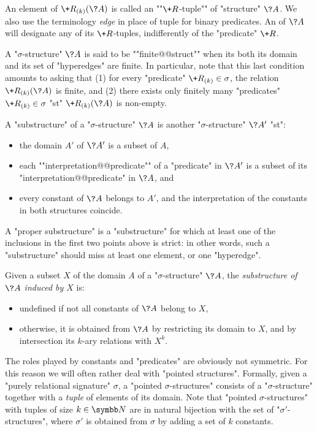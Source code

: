 An element of $\+R_{(k)}(\?A)$ is called an \AP""$\+R$-tuple""
of "structure" $\?A$. We also use the terminology \emph{edge} in place
of tuple for binary predicates.
An  of $\?A$ will designate any of its $\+R$-tuples,
indifferently of the "predicate" $\+R$.

A "$\sigma$-structure" $\?A$ is said to be \AP""finite@@struct"" when its
both its domain and its set of "hyperedges" are finite.
In particular, note that this last condition amounts to asking
that (1) for every "predicate" $\+R_{(k)} \in \sigma$, the relation $\+R_{(k)}(\?A)$ is finite,
and (2) there exists only finitely many "predicates" $\+R_{(k)} \in \sigma$
"st" $\+R_{(k)}(\?A)$ is non-empty.

A "substructure" of a "$\sigma$-structure" $\?A$ is another
"$\sigma$-structure" $\?A'$ "st":
\begin{itemize}
	\item the domain $A'$ of $\?A'$ is a subset of $A$,
	\item each ""interpretation@@predicate"" of a "predicate" in $\?A'$ 
		is a subset of its "interpretation@@predicate" in $\?A$, and
	\item every constant of $\?A$ belongs to $A'$, and the interpretation
		of the constants in both structures coincide. 
\end{itemize}
A "proper substructure" is a "substructure" for which
at least one of the inclusions in the first two points above
is strict: in other words, such a "substructure" should
miss at least one element, or one "hyperedge".

Given a subset $X$ of the domain $A$ of a "$\sigma$-structure" $\?A$,
the \emph{substructure of $\?A$ induced by $X$} is:
\begin{itemize}
	\item undefined if not all constants of $\?A$ belong to $X$,
	\item otherwise, it is obtained from $\?A$ by restricting
		its domain to $X$, and by intersection its $k$-ary relations
		with $X^k$.
\end{itemize}

The roles played by constants and "predicates" are obviously not symmetric.
For this reason we will often rather deal with "pointed structures".
Formally, given a "purely relational signature" $\sigma$,
a "pointed $\sigma$-structures" consists of a "$\sigma$-structure"
together with a \emph{tuple} of elements of its domain.
Note that "pointed $\sigma$-structures" with tuples of size $k\in \N$ are in natural
bijection with the set of "$\sigma'$-structures", where $\sigma'$
is obtained from $\sigma$ by adding a set of $k$ constants.

